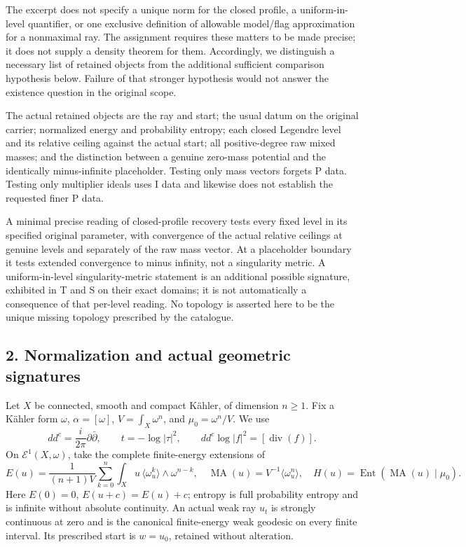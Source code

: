 \documentclass[
  11pt,
]{article}
\begin{document}
The excerpt does not specify a unique norm for the closed profile, a
uniform-in-level quantifier, or one exclusive definition of allowable
model/flag approximation for a nonmaximal ray. The assignment requires
these matters to be made precise; it does not supply a density theorem
for them. Accordingly, we distinguish a necessary list of retained
objects from the additional sufficient comparison hypothesis below.
Failure of that stronger hypothesis would not answer the existence
question in the original scope.

The actual retained objects are the ray and start; the usual datum on
the original carrier; normalized energy and probability entropy; each
closed Legendre level and its relative ceiling against the actual start;
all positive-degree raw mixed masses; and the distinction between a
genuine zero-mass potential and the identically minus-infinite
placeholder. Testing only mass vectors forgets P data. Testing only
multiplier ideals uses I data and likewise does not establish the
requested finer P data.

A minimal precise reading of closed-profile recovery tests every fixed
level in its specified original parameter, with convergence of the
actual relative ceilings at genuine levels and separately of the raw
mass vector. At a placeholder boundary it tests extended convergence to
minus infinity, not a singularity metric. A uniform-in-level
singularity-metric statement is an additional possible signature,
exhibited in T and S on their exact domains; it is not automatically a
consequence of that per-level reading. No topology is asserted here to
be the unique missing topology prescribed by the catalogue.

\subsection{2. Normalization and actual geometric
signatures}\label{normalization-and-actual-geometric-signatures}

Let \(X\) be connected, smooth and compact Kähler, of dimension
\(n\ge1\). Fix a Kähler form \(\omega\), \(\alpha=[\omega]\),
\(V=\int_X\omega^n\), and \(\mu_0=\omega^n/V\). We use \[
dd^c=\frac{i}{2\pi}\partial\bar\partial,
\qquad t=-\log|\tau|^2,
\qquad dd^c\log|f|^2=[\operatorname{div}(f)].                 \tag{1}
\] On \(\mathcal E^1(X,\omega)\), take the complete finite-energy
extensions of \[
E(u)=\frac1{(n+1)V}\sum_{k=0}^n\int_Xu\,
 \langle\omega_u^k\rangle\wedge\omega^{n-k},\quad
\operatorname{MA}(u)=V^{-1}\langle\omega_u^n\rangle,
\quad H(u)=\operatorname{Ent}(\operatorname{MA}(u)\mid\mu_0).             \tag{2}
\] Here \(E(0)=0\), \(E(u+c)=E(u)+c\); entropy is full probability
entropy and is infinite without absolute continuity. An actual weak ray
\(u_t\) is strongly continuous at zero and is the canonical
finite-energy weak geodesic on every finite interval. Its prescribed
start is \(w=u_0\), retained without alteration.
\end{document}
